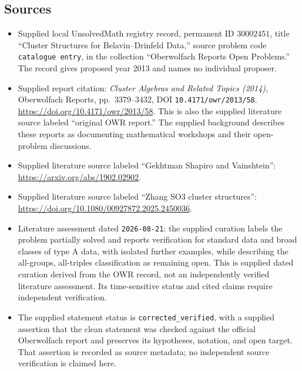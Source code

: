\documentclass[11pt]{article}
\begin{document}
\subsection{Sources}
\begin{itemize}
\item Supplied local UnsolvedMath registry record, permanent ID \(30002451\), title ``Cluster Structures for Belavin--Drinfeld Data,'' source problem code \texttt{catalogue entry}, in the collection ``Oberwolfach Reports Open Problems.'' The record gives proposed year 2013 and names no individual proposer.
\item Supplied report citation: \emph{Cluster Algebras and Related Topics (2014)}, Oberwolfach Reports, pp.~3379--3432, DOI \texttt{10.4171/owr/2013/58}. \url{https://doi.org/10.4171/owr/2013/58}. This is also the supplied literature source labeled ``original OWR report.'' The supplied background describes these reports as documenting mathematical workshops and their open-problem discussions.
\item Supplied literature source labeled ``Gekhtman Shapiro and Vainshtein'': \url{https://arxiv.org/abs/1902.02902}.
\item Supplied literature source labeled ``Zhang SO3 cluster structures'': \url{https://doi.org/10.1080/00927872.2025.2450036}.
\item Literature assessment dated \texttt{2026-08-21}: the supplied curation labels the problem partially solved and reports verification for standard data and broad classes of type A data, with isolated further examples, while describing the all-groups, all-triples classification as remaining open. This is supplied dated curation derived from the OWR record, not an independently verified literature assessment. Its time-sensitive status and cited claims require independent verification.
\item The supplied statement status is \texttt{corrected\_verified}, with a supplied assertion that the clean statement was checked against the official Oberwolfach report and preserves its hypotheses, notation, and open target. That assertion is recorded as source metadata; no independent source verification is claimed here.
\end{itemize}
\end{document}
